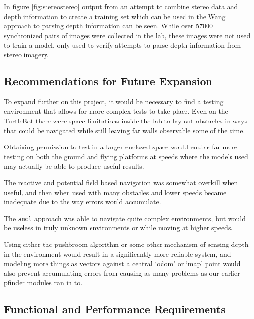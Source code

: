 \documentclass{article}[12]
\begin{document}
In figure \ref{fig:stereostereo} output from an attempt to combine stereo data and depth information to create a training set which can be used in the Wang \cite{Wang_2018_CVPR} approach to parsing depth information can be seen. While over 57000 synchronized pairs of images were collected in the lab, these images were not used to train a model, only used to verify attempts to parse depth information from stereo imagery.

\subsection{Recommendations for Future Expansion}

To expand further on this project, it would be necessary to find a testing environment that allows for more complex tests to take place. Even on the TurtleBot there were space limitations inside the lab to lay out obstacles in ways that could be navigated while still leaving far walls observable some of the time. 

Obtaining permission to test in a larger enclosed space would enable far more testing on both the ground and flying platforms at speeds where the models used may actually be able to produce useful results. 

The reactive and potential field based navigation was somewhat overkill when useful, and then when used with many obstacles and lower speeds became inadequate due to the way errors would accumulate.

The \texttt{amcl} approach was able to navigate quite complex environments, but would be useless in truly unknown environments or while moving at higher speeds. 

Using either the pushbroom algorithm or some other mechanism of sensing depth in the environment would result in a significantly more reliable system, and modeling more things as vectors against a central `odom' or `map' point would also prevent accumulating errors from causing as many problems as our earlier pfinder modules ran in to.
 
 \subsection{Functional and Performance Requirements}
\end{document}

